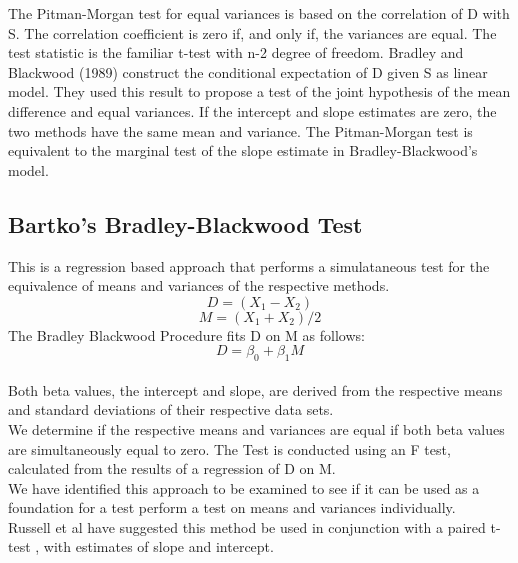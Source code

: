 \documentclass[12pt, a4paper]{report}
\theoremstyle{plain}
\theoremstyle{definition}
\theoremstyle{remark}
\begin{document}
The Pitman-Morgan test for equal variances is based on the correlation of D with S. The correlation coefficient is zero if, and only if, the variances are equal. The test statistic is the familiar t-test with n-2 degree of freedom.
Bradley and Blackwood (1989) construct the conditional expectation of D given S as linear model.  They used this result to propose a test of the joint hypothesis of the mean difference and equal variances. 
If the intercept and slope estimates are zero, the two methods have the same mean and variance.
The Pitman-Morgan test is equivalent to the marginal test of the slope estimate in Bradley-Blackwood’s model.

\subsection{Bartko's Bradley-Blackwood Test}
This is a regression based approach that performs a simulataneous
test for the equivalence of means and variances of the respective
methods.\\
\begin{equation}
D = (X_{1}-X_{2})
\end{equation}
\begin{equation}
M = (X_{1} + X_{2}) /2
\end{equation}
The Bradley Blackwood Procedure fits D on M as follows:\\
\begin{equation}
D = \beta_{0} + \beta_{1}M
\end{equation}
\\Both beta values, the intercept and slope, are derived from the respective means and
standard deviations of their respective data sets.\\
We determine if the respective means and variances are equal if
both beta values are simultaneously equal to zero. The Test is
conducted using an F test, calculated from the results of a
regression of D on M.
\\We have identified this approach  to be examined to see if it can
be used as a foundation for a test perform a test on means and
variances individually.\\
Russell et al have suggested this method be used in conjunction
with a paired t-test , with estimates of slope and intercept.
\end{document}
